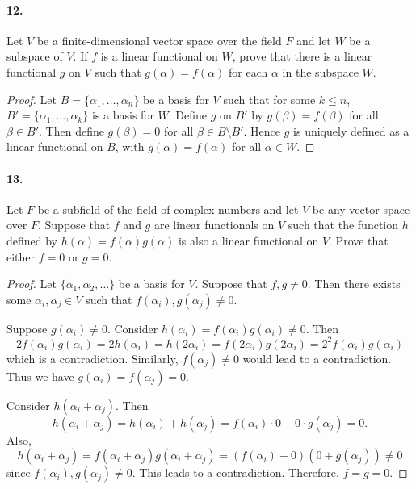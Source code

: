\documentclass{article}
\begin{document}
\paragraph{12.} Let $V$ be a finite-dimensional vector space over the field $F$
and let $W$ be a subspace of $V$. If $f$ is a linear functional on $W$, prove
that there is a linear functional $g$ on $V$ such that $g(\alpha) = f(\alpha)$
for each $\alpha$ in the subspace $W$.

\begin{proof}
  Let $B = \{\alpha_1, \ldots, \alpha_n\}$ be a basis for $V$ such that for some
  $k \leq n$, $B' = \{\alpha_1, \ldots, \alpha_k\}$ is a basis for $W$. Define
  $g$ on $B'$ by $g(\beta) = f(\beta)$ for all $\beta \in B'$. Then define
  $g(\beta) = 0$ for all $\beta \in B \setminus B'$. Hence $g$ is uniquely
  defined as a linear functional on $B$, with $g(\alpha) = f(\alpha)$ for all
  $\alpha \in W$.
\end{proof}

\paragraph{13.} Let $F$ be a subfield of the field of complex numbers and let
$V$ be any vector space over $F$. Suppose that $f$ and $g$ are linear
functionals on $V$ such that the function $h$ defined by $h(\alpha) = f(\alpha)
g(\alpha)$ is also a linear functional on $V$. Prove that either $f = 0$ or $g =
0$.

\begin{proof}
  Let $\{\alpha_1, \alpha_2, \ldots\}$ be a basis for $V$. Suppose that $f, g
  \neq 0$. Then there exists some $\alpha_i, \alpha_j \in V$ such that
  $f(\alpha_i), g(\alpha_j) \neq 0$.

  Suppose $g(\alpha_i) \neq 0$. Consider $h(\alpha_i) = f(\alpha_i)g(\alpha_i)
  \neq 0$. Then \[
    2f(\alpha_i)g(\alpha_i) = 2h(\alpha_i) = h(2\alpha_i) =
    f(2\alpha_i)g(2\alpha_i) = 2^2f(\alpha_i)g(\alpha_i)
  \] which is a contradiction. Similarly, $f(\alpha_j) \neq 0$ would lead to a
  contradiction. Thus we have $g(\alpha_i) = f(\alpha_j) = 0$.

  Consider $h(\alpha_i + \alpha_j)$. Then \[
    h(\alpha_i + \alpha_j) = h(\alpha_i) + h(\alpha_j) = f(\alpha_i) \cdot 0 +
    0 \cdot g(\alpha_j) = 0.
  \] Also, \[
    h(\alpha_i + \alpha_j) = f(\alpha_i + \alpha_j)g(\alpha_i + \alpha_j) =
    (f(\alpha_i) + 0)(0 + g(\alpha_j)) \neq 0
  \] since $f(\alpha_i), g(\alpha_j) \neq 0$. This leads to a contradiction.
  Therefore, $f = g = 0$.
\end{proof}
\end{document}

